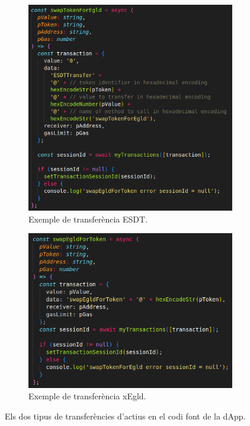 \documentclass[11pt,a4paper]{article}
\begin{document}
\begin{figure}[!htb]
\begin{subfigure}[b]{0.47\textwidth}
  \includegraphics[width=\linewidth]{imp-esdttransfer.png}
  \caption{Exemple de transferència ESDT.}\label{fig:impesdttransfer}
\end{subfigure}\hfill
\begin{subfigure}[b]{0.47\textwidth}
  \includegraphics[width=\linewidth]{imp-egldtransfer.png}
  \caption{Exemple de transferència xEgld.}\label{fig:screentrade}
\end{subfigure}\hfill
\caption{Els dos tipus de transferències d'actius en el codi font de la dApp.}
\label{fig:tipustransfer}
\end{figure}
\end{document}
